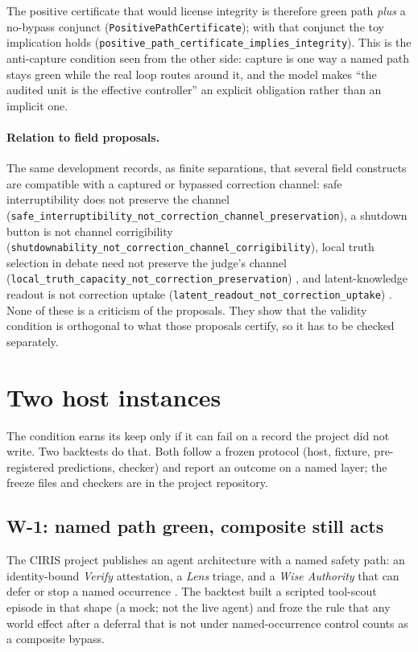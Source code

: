 \documentclass[11pt]{article}
\theoremstyle{remark}
\newcommand{\lean}[1]{\texttt{#1}}
\begin{document}
The positive certificate that would license integrity is therefore green path \emph{plus} a no-bypass conjunct (\lean{PositivePathCertificate}); with that conjunct the toy implication holds (\lean{positive\_path\_certificate\_implies\_integrity}). This is the anti-capture condition seen from the other side: capture is one way a named path stays green while the real loop routes around it, and the model makes ``the audited unit is the effective controller'' an explicit obligation rather than an implicit one.

\paragraph{Relation to field proposals.}
The same development records, as finite separations, that several field constructs are compatible with a captured or bypassed correction channel: safe interruptibility does not preserve the channel (\lean{safe\_interruptibility\_not\_correction\_channel\_preservation}), a shutdown button is not channel corrigibility (\lean{shutdownability\_not\_correction\_channel\_corrigibility}), local truth selection in debate need not preserve the judge's channel (\lean{local\_truth\_capacity\_not\_correction\_preservation}) \parencite{irving2018debate}, and latent-knowledge readout is not correction uptake (\lean{latent\_readout\_not\_correction\_uptake}) \parencite{christiano2021elk}. None of these is a criticism of the proposals. They show that the validity condition is orthogonal to what those proposals certify, so it has to be checked separately.

\section{Two host instances}
\label{sec:hosts}

The condition earns its keep only if it can fail on a record the project did not write. Two backtests do that. Both follow a frozen protocol (host, fixture, pre-registered predictions, checker) and report an outcome on a named layer; the freeze files and checkers are in the project repository.

\subsection{W-1: named path green, composite still acts}

The CIRIS project publishes an agent architecture with a named safety path: an identity-bound \emph{Verify} attestation, a \emph{Lens} triage, and a \emph{Wise Authority} that can defer or stop a named occurrence \parencite{ciris2026accord,cirisai2026verify}. The backtest built a scripted tool-scout episode in that shape (a mock; not the live agent) and froze the rule that any world effect after a deferral that is not under named-occurrence control counts as a composite bypass.
\end{document}
